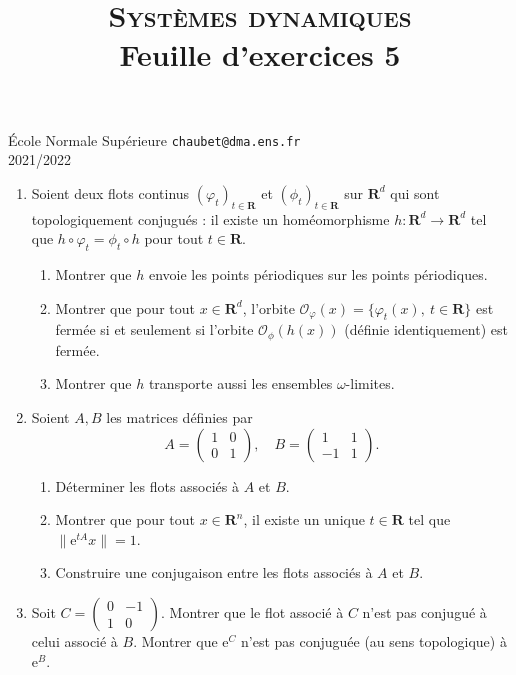 \documentclass[a4paper,10pt,openany]{article}
\title{\textsc{Syst\`emes dynamiques} \\ Feuille d'exercices 5}
\date{}
\author{}
\theoremstyle{plain}
\theoremstyle{definition}
\newcommand{\e}{\mathrm{e}}
\newcommand{\R}{\mathbf{R}}
\begin{document}
{\noindent \'Ecole Normale Sup\'erieure  \hfill \texttt{chaubet@dma.ens.fr} } \\
{2021/2022 \hfill }

{\let\newpage\relax\maketitle}
\maketitle

  \vspace{1.5mm} 


\begin{enumerate}
\item Soient deux flots continus $(\varphi_t)_{t \in \R}$ et $(\phi_t)_{t\in \R}$ sur $\R^d$ qui sont topologiquement conjugu\'es : il existe un hom\'eomorphisme $h : \R^d \to \R^d$ tel que $h \circ \varphi_t = \phi_t \circ h$ pour tout $t \in \R.$
\begin{enumerate}
\item Montrer que $h$ envoie les points p\'eriodiques sur les points p\'eriodiques.
\item Montrer que pour tout $x \in \R^d$, l'orbite 
$\mathcal{O}_{\varphi}(x) = \{\varphi_t(x),~t\in \R\}$
est ferm\'ee si et seulement si l'orbite $\mathcal{O}_\phi(h(x))$ (d\'efinie identiquement) est ferm\'ee.
\item Montrer que $h$ transporte aussi les ensembles $\omega$-limites.
\end{enumerate}
\item Soient $A,B$ les matrices d\'efinies par
$$
A=\left(\begin{array}{ll}1 & 0 \\ 0 & 1\end{array}\right), \quad B=\left(\begin{array}{cc}1 & 1 \\ -1 & 1\end{array}\right).
$$
\begin{enumerate}
\item D\'eterminer les flots associ\'es \`a $A$ et $B$.
\item Montrer que pour tout $x \in \R^n$, il existe un unique $t \in \R$ tel que $\|\e^{tA}x\| = 1$.
\item Construire une conjugaison entre les flots associ\'es \`a $A$ et $B$.
\end{enumerate}

\item Soit 
$
C = \begin{pmatrix} 0 & -1 \\ 1 & 0 \end{pmatrix}.
$
Montrer que le flot associ\'e \`a $C$ n'est pas conjugu\'e \`a celui associ\'e \`a $B$. Montrer que $\e^{C}$ n'est pas conjugu\'ee (au sens topologique) \`a $\e^{B}$.
\end{enumerate}
\vspace{0.6cm}
\end{document}
